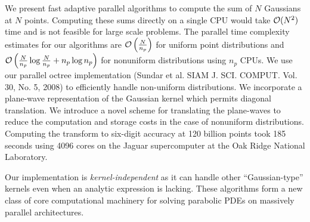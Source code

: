 We present fast adaptive parallel algorithms to compute the sum of $N$ Gaussians at $N$ points. 
Computing these sums directly on a single CPU would take $\mathcal{O}(N^2)$ time and is not feasible
for large scale problems. The parallel time complexity estimates for our algorithms are $ \mathcal{O} \left(\frac{N}{n_p} \right)$ 
for uniform point distributions and $ \mathcal{O}\left(\frac{N}{n_p}\log \frac{N}{n_p} + n_p \log n_p\right)$ 
for nonuniform distributions using $n_p$ CPUs. We use our parallel octree implementation (Sundar et al. 
SIAM J. SCI. COMPUT. Vol. 30, No. 5, 2008) to efficiently handle non-uniform distributions. We incorporate
 a plane-wave representation of the Gaussian kernel which permits diagonal translation. We introduce a 
 novel scheme for translating the plane-waves to reduce the computation and storage costs in the case of 
 nonuniform distributions. Computing the transform to six-digit accuracy at 120 billion points took
 185 seconds using 4096 cores on the Jaguar supercomputer at the Oak Ridge National Laboratory. 

Our implementation is {\em kernel-independent} as it can handle other ``Gaussian-type'' kernels even
 when an analytic expression is lacking. These algorithms form a new class of core computational machinery 
 for solving parabolic PDEs on massively parallel architectures. 
